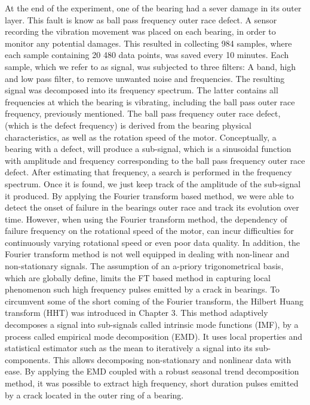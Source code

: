 \documentclass[thesis.tex]{subfiles}
\begin{document}
	At the end of the experiment, one of the bearing had a sever damage in its outer layer. This fault is know as ball pass frequency outer race defect. A sensor recording the vibration movement was placed on each bearing, in order to monitor any potential damages. This resulted in collecting 984 samples, where each sample containing 20 480 data points, was saved every 10 minutes.
	\justify
	Each sample, which we refer to as signal, was subjected to three filters: A band, high and low pass filter, to remove unwanted noise and frequencies. The resulting signal was decomposed into its frequency spectrum. The latter contains all frequencies at which the bearing is vibrating, including the ball pass outer race frequency, previously mentioned.
	The ball pass frequency outer race defect, (which is the defect frequency) is derived from the bearing physical characteristics, as well as the rotation speed of the motor. Conceptually, a bearing with a defect, will produce a sub-signal, which is a sinusoidal function with amplitude and frequency corresponding to the ball pass frequency outer race defect. After estimating that frequency, a search is performed in the frequency spectrum. Once it is found, we just keep track of the amplitude of the sub-signal it produced.
	\justify
	By applying the Fourier transform based method, we were able to detect the onset of failure in the bearings outer race and track its evolution over time. However, when using the Fourier transform method, the dependency of failure frequency on the rotational speed of the motor, can incur difficulties for continuously varying rotational speed or even poor data quality. In addition, the Fourier transform method is not well equipped in dealing with non-linear and non-stationary signals. The assumption of an a-priory trigonometrical basis, which are globally define, limits the FT based method in capturing local phenomenon such high frequency pulses emitted by a crack in bearings.
	\justify
	To circumvent some of the short coming of the Fourier transform, the Hilbert Huang transform (HHT) was introduced in Chapter 3.
	This method adaptively decomposes a signal into sub-signals called intrinsic mode functions (IMF), by a process called empirical mode decomposition (EMD). It uses local properties and statistical estimator such as the mean to iteratively
	 a signal into its sub-components. This allows decomposing non-stationary and nonlinear data with ease.
	By applying the EMD coupled with a robust seasonal trend decomposition method, it was possible to extract high frequency, short duration pulses emitted by a crack located in the outer ring of a bearing.
\end{document}
